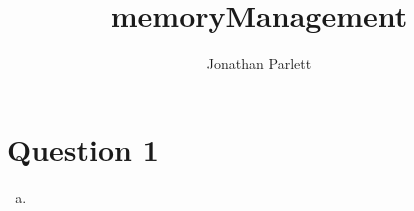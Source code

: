 \documentclass[14pt]{extreport}
\title{memoryManagement}
\author{Jonathan Parlett}
\begin{document}
\maketitle

\section*{Question 1}
\begin{enumerate}[a.]
    \item
\end{enumerate}
\end{document}
